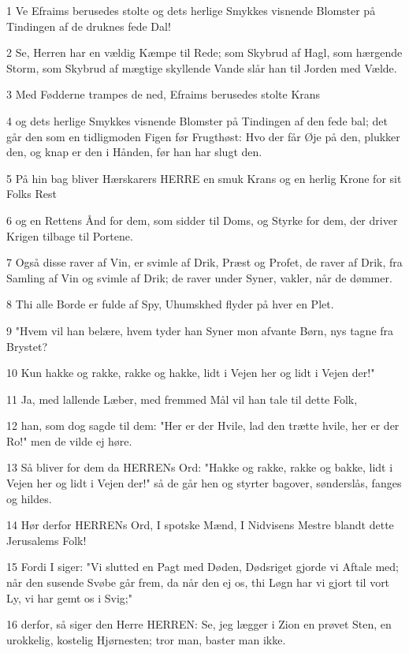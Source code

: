 \par 1 Ve Efraims berusedes stolte og dets herlige Smykkes visnende Blomster på Tindingen af de druknes fede Dal!
\par 2 Se, Herren har en vældig Kæmpe til Rede; som Skybrud af Hagl, som hærgende Storm, som Skybrud af mægtige skyllende Vande slår han til Jorden med Vælde.
\par 3 Med Fødderne trampes de ned, Efraims berusedes stolte Krans
\par 4 og dets herlige Smykkes visnende Blomster på Tindingen af den fede bal; det går den som en tidligmoden Figen før Frugthøst: Hvo der får Øje på den, plukker den, og knap er den i Hånden, før han har slugt den.
\par 5 På hin bag bliver Hærskarers HERRE en smuk Krans og en herlig Krone for sit Folks Rest
\par 6 og en Rettens Ånd for dem, som sidder til Doms, og Styrke for dem, der driver Krigen tilbage til Portene.
\par 7 Også disse raver af Vin, er svimle af Drik, Præst og Profet, de raver af Drik, fra Samling af Vin og svimle af Drik; de raver under Syner, vakler, når de dømmer.
\par 8 Thi alle Borde er fulde af Spy, Uhumskhed flyder på hver en Plet.
\par 9 "Hvem vil han belære, hvem tyder han Syner mon afvante Børn, nys tagne fra Brystet?
\par 10 Kun hakke og rakke, rakke og hakke, lidt i Vejen her og lidt i Vejen der!"
\par 11 Ja, med lallende Læber, med fremmed Mål vil han tale til dette Folk,
\par 12 han, som dog sagde til dem: "Her er der Hvile, lad den trætte hvile, her er der Ro!" men de vilde ej høre.
\par 13 Så bliver for dem da HERRENs Ord: "Hakke og rakke, rakke og bakke, lidt i Vejen her og lidt i Vejen der!" så de går hen og styrter bagover, sønderslås, fanges og hildes.
\par 14 Hør derfor HERRENs Ord, I spotske Mænd, I Nidvisens Mestre blandt dette Jerusalems Folk!
\par 15 Fordi I siger: "Vi slutted en Pagt med Døden, Dødsriget gjorde vi Aftale med; når den susende Svøbe går frem, da når den ej os, thi Løgn har vi gjort til vort Ly, vi har gemt os i Svig;"
\par 16 derfor, så siger den Herre HERREN: Se, jeg lægger i Zion en prøvet Sten, en urokkelig, kostelig Hjørnesten; tror man, baster man ikke.

